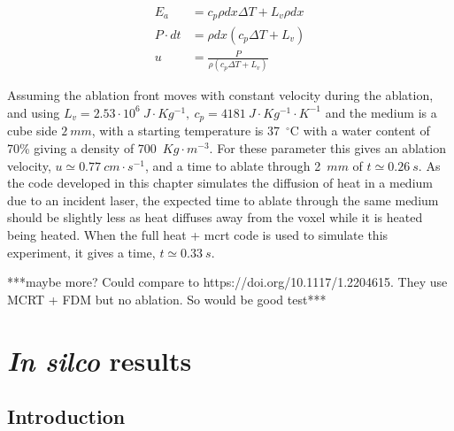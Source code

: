 \begin{align}
E_a &= c_p \rho dx \Delta T + L_v \rho dx \label{eqn:ablationenergy}\\
P\cdot dt &= \rho dx (c_p \Delta T + L_v) \label{eqn:midequationablation} \\
u &= \frac{P}{\rho(c_p\Delta T+ L_v)} \label{eqn:ablationvelo}
\end{align}

Assuming the ablation front moves with constant velocity during the ablation, and using $L_v=2.53\cdot 10^6\ J\cdot Kg^{-1},\ c_p=4181\ J\cdot Kg^{-1}\cdot K^{-1}$ and the medium is a cube side $2\ mm$, with a starting temperature is 37~$^{\circ}$C with a water content of 70\% giving a density of 700~$Kg\cdot m^{-3}$. For these parameter this gives an ablation velocity, $u\simeq 0.77\ cm\cdot s^{-1}$, and a time to ablate through 2~$mm$ of $t \simeq 0.26~s$.
As the code developed in this chapter simulates the diffusion of heat in a medium due to an incident laser, the expected time to ablate through the same medium should be slightly less as heat diffuses away from the voxel while it is heated being heated. When the full heat + \gls{mcrt} code is used to simulate this experiment, it gives a time, $t \simeq 0.33~s$.	

\medskip

***maybe more? Could compare to https://doi.org/10.1117/1.2204615. They use MCRT + FDM but no ablation. So would be good test***


\section{\textit{In silco} results} 

\subsection{Introduction}%

